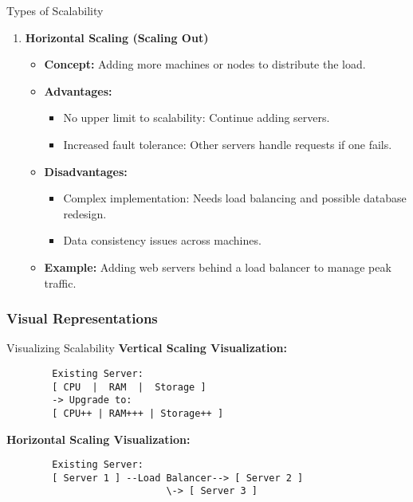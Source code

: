 \documentclass[aspectratio=169]{beamer}
\begin{document}
\begin{frame}[fragile]
\begin{block}{Types of Scalability}
\begin{enumerate}
            \item \textbf{Horizontal Scaling (Scaling Out)}
                \begin{itemize}
                    \item \textbf{Concept:} Adding more machines or nodes to distribute the load.
                    \item \textbf{Advantages:}
                        \begin{itemize}
                            \item No upper limit to scalability: Continue adding servers.
                            \item Increased fault tolerance: Other servers handle requests if one fails.
                        \end{itemize}
                    \item \textbf{Disadvantages:}
                        \begin{itemize}
                            \item Complex implementation: Needs load balancing and possible database redesign.
                            \item Data consistency issues across machines.
                        \end{itemize}
                    \item \textbf{Example:} Adding web servers behind a load balancer to manage peak traffic.
                \end{itemize}
        \end{enumerate}
    \end{block}
\end{frame}

\begin{frame}[fragile]
    \frametitle{Visual Representations}
    \begin{block}{Visualizing Scalability}
        \textbf{Vertical Scaling Visualization:}
        \begin{lstlisting}
        Existing Server: 
        [ CPU  |  RAM  |  Storage ] 
        -> Upgrade to: 
        [ CPU++ | RAM+++ | Storage++ ]
        \end{lstlisting}
        
        \textbf{Horizontal Scaling Visualization:}
        \begin{lstlisting}
        Existing Server: 
        [ Server 1 ] --Load Balancer--> [ Server 2 ]
                            \-> [ Server 3 ]
        \end{lstlisting}
    \end{block}
\end{frame}
\end{document}
